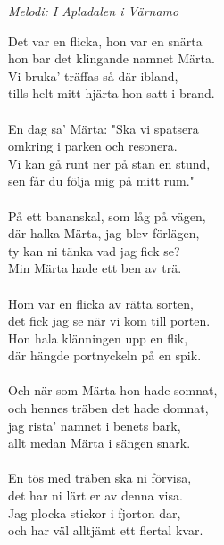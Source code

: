 {\footnotesize\textit{Melodi: I Apladalen i Värnamo}}\par
\vspace{10pt}
Det var en flicka, hon var en snärta\\
hon bar det klingande namnet Märta.\\
Vi bruka' träffas så där ibland,\\
tills helt mitt hjärta hon satt i brand.\\
\\
En dag sa' Märta: "Ska vi spatsera\\
omkring i parken och resonera.\\
Vi kan gå runt ner på stan en stund,\\
sen får du följa mig på mitt rum."\\
\\
På ett bananskal, som låg på vägen,\\
där halka Märta, jag blev förlägen,\\
ty kan ni tänka vad jag fick se?\\
Min Märta hade ett ben av trä.\\
\\
Hom var en flicka av rätta sorten,\\
det fick jag se när vi kom till porten.\\
Hon hala klänningen upp en flik,\\
där hängde portnyckeln på en spik.\\
\\
Och när som Märta hon hade somnat,\\
och hennes träben det hade domnat,\\
jag rista' namnet i benets bark,\\
allt medan Märta i sängen snark.\\
\\
En tös med träben ska ni förvisa,\\
det har ni lärt er av denna visa.\\
Jag plocka stickor i fjorton dar,\\
och har väl alltjämt ett flertal kvar.
